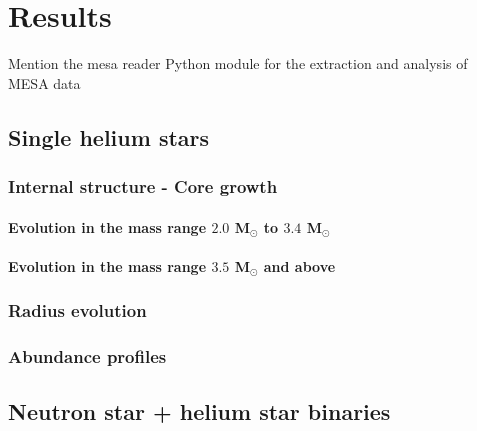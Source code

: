 \documentclass[../../main/thesis_msc.tex]{subfiles}
\begin{document}
	\chapter{Results}
	
		Mention the mesa reader Python module for the extraction and analysis of MESA data
		
			\section{Single helium stars}
			
				\subsection{Internal structure - Core growth}
				
					\subsubsection{Evolution in the mass range $2.0$ M$_{\odot}$ to $3.4$ M$_{\odot}$}
					
					\subsubsection{Evolution in the mass range $3.5$ M$_{\odot}$ and above}
				
				
				\subsection{Radius evolution}
				
				
				\subsection{Abundance profiles}	
			
			
			
			\section{Neutron star + helium star binaries}
\end{document}

